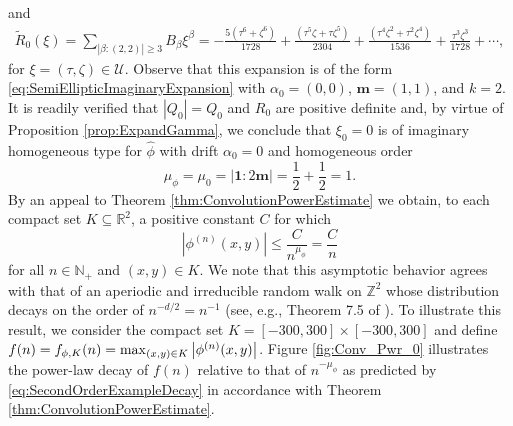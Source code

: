 \documentclass[11pt]{article}
\newenvironment{example}
  {\pushQED{\qed}\renewcommand{\qedsymbol}{$\triangle$}\examplex}
  {\popQED\endexamplex}
\theoremstyle{remark}
\newcommand{\f}[2]{\frac{#1}{#2}}
\begin{document}
\begin{example}
\begin{equation*}
\end{equation*}
and
\begin{eqnarray*}
\widetilde{R}_{0}(\xi)=\sum_{|\beta:(2,2)|\geq 3}B_\beta \xi^\beta =
-\f{5(\tau^6+\zeta^6)}{1728} + \f{(\tau^5\zeta+\tau\zeta^5)}{2304} + \frac{(\tau^4\zeta^2+\tau^2\zeta^4)}{1536} +   \frac{\tau^3\zeta^3}{1728} + \cdots, 
\end{eqnarray*}
for $\xi=(\tau,\zeta)\in\mathcal{U}$. Observe that this expansion is of the form \eqref{eq:SemiEllipticImaginaryExpansion} with $\alpha_0=(0,0)$, $\mathbf{m}=(1,1)$, and $k=2$. It is readily verified that $|Q_0|=Q_0$ and $R_0$ are positive definite and, by virtue of Proposition \ref{prop:ExpandGamma}, we conclude that $\xi_0=0$ is of imaginary homogeneous type for $\widehat\phi$ with drift $\alpha_0=0$ and homogeneous order
\begin{equation*}
    \mu_{\phi}=\mu_0=|\mathbf{1}:2\mathbf{m}|=\frac{1}{2}+\frac{1}{2}=1.
\end{equation*}
By an appeal to Theorem \ref{thm:ConvolutionPowerEstimate} we obtain, to each compact set $K\subseteq\mathbb{R}^2$, a positive constant $C$ for which
\begin{equation}\label{eq:SecondOrderExampleDecay}
    |\phi^{(n)}(x,y)|\leq \frac{C}{n^{\mu_\phi}}=\frac{C}{n}
\end{equation}
for all $n\in\mathbb{N}_+$ and $(x,y)\in K$. We note that this asymptotic behavior agrees with that of an aperiodic and irreducible random walk on $\mathbb{Z}^2$ whose distribution decays on the order of $n^{-d/2}=n^{-1}$ (see, e.g., Theorem 7.5 of \cite{randles_convolution_2017}). To illustrate this result, we consider the compact set $K = [-300, 300] \times [-300, 300]$ and define $f(n)=f_{\phi,K}(n)=\max_{(x,y)\in K}\abs{\phi^{(n)}(x,y)}$. Figure \ref{fig:Conv_Pwr_0} illustrates the power-law decay of $f(n)$ relative to that of $n^{-\mu_\phi}$ as predicted by \eqref{eq:SecondOrderExampleDecay} in accordance with Theorem \ref{thm:ConvolutionPowerEstimate}.\\



\end{example}
\end{document}
